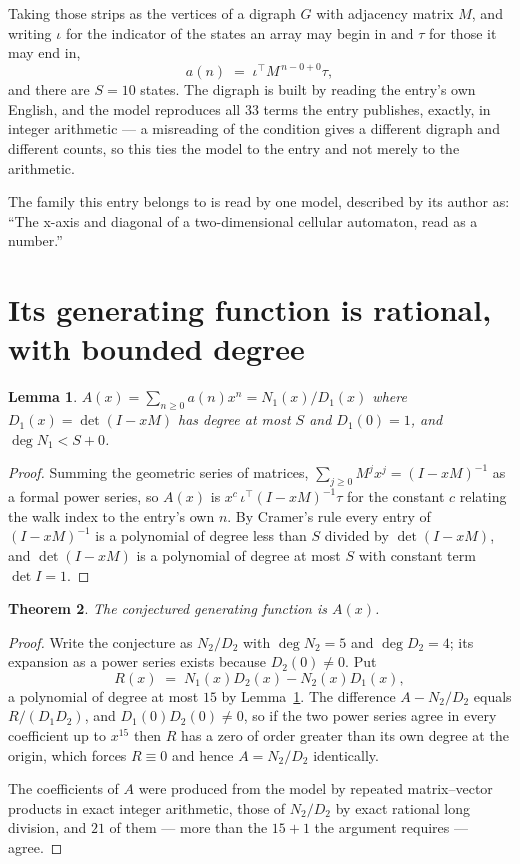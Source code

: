 \documentclass[11pt,a4paper]{article}
\theoremstyle{plain}
\newtheorem{theorem}{Theorem}
\newtheorem{lemma}[theorem]{Lemma}
\theoremstyle{definition}
\begin{document}
Taking those strips as the vertices of a digraph $G$ with adjacency matrix $M$, and writing
$\iota$ for the indicator of the states an array may begin in and $\tau$ for those it may end
in,
\[
a(n)\;=\;\iota^{\!\top}M^{\,n-0+0}\tau ,
\]
and there are $S=10$ states. The digraph is built by reading the entry's own English, and the
model reproduces all $33$ terms the entry publishes, exactly, in integer arithmetic --- a
misreading of the condition gives a different digraph and different counts, so this ties the
model to the entry and not merely to the arithmetic.

The family this entry belongs to is read by one model, described by its author as: ``The x-axis and diagonal of a two-dimensional cellular automaton, read as a number.''


\section{Its generating function is rational, with bounded degree}

\begin{lemma}\label{lem:rat}
$A(x)=\sum_{n\ge0}a(n)x^n=N_1(x)/D_1(x)$ where $D_1(x)=\det(I-xM)$ has degree at most
$S$ and $D_1(0)=1$, and $\deg N_1<S+0$.
\end{lemma}

\begin{proof}
Summing the geometric series of matrices, $\sum_{j\ge0}M^jx^j=(I-xM)^{-1}$ as a formal
power series, so $A(x)$ is $x^{c}\,\iota^{\!\top}(I-xM)^{-1}\tau$ for the constant $c$
relating the walk index to the entry's own $n$. By Cramer's rule every entry of
$(I-xM)^{-1}$ is a polynomial of degree less than $S$ divided by $\det(I-xM)$, and
$\det(I-xM)$ is a polynomial of degree at most $S$ with constant term $\det I=1$.
\end{proof}

\begin{theorem}
The conjectured generating function is $A(x)$.
\end{theorem}

\begin{proof}
Write the conjecture as $N_2/D_2$ with $\deg N_2=5$ and $\deg D_2=4$; its expansion as a
power series exists because $D_2(0)\neq0$. Put
\[
R(x)\;=\;N_1(x)D_2(x)-N_2(x)D_1(x),
\]
a polynomial of degree at most $15$ by Lemma~\ref{lem:rat}. The difference
$A-N_2/D_2$ equals $R/(D_1D_2)$, and $D_1(0)D_2(0)\neq0$, so if the two power series agree in
every coefficient up to $x^{15}$ then $R$ has a zero of order greater than its own
degree at the origin, which forces $R\equiv0$ and hence $A=N_2/D_2$ identically.

The coefficients of $A$ were produced from the model by repeated matrix--vector products in
exact integer arithmetic, those of $N_2/D_2$ by exact rational long division, and $21$
of them --- more than the $15+1$ the argument requires --- agree.
\end{proof}
\end{document}
